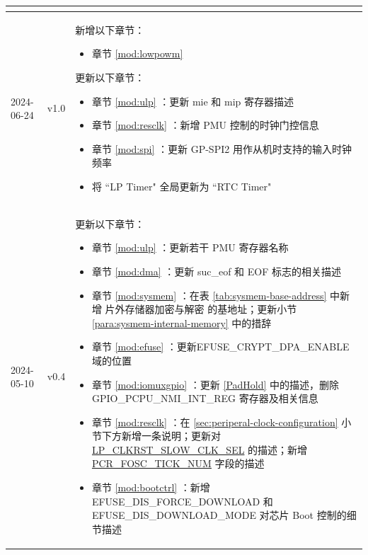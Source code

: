 \begin{longtable}[l]{ | m{2cm} | m{1.5cm} | m{12cm} | }
\begin{itemize}
    \end{itemize}
    \\\hline
    2024-06-24        & v1.0 &
    新增以下章节：
    \begin{itemize}
        \item 章节 \ref{mod:lowpowm} \nameref{mod:lowpowm}
    \end{itemize}
    更新以下章节：
    \begin{itemize}
        \item 章节 \ref{mod:ulp} \textit{\nameref{mod:ulp}}：更新 mie 和 mip 寄存器描述 %
        \item 章节 \ref{mod:resclk} \textit{\nameref{mod:resclk}}：新增 PMU 控制的时钟门控信息 %
        \item 章节 \ref{mod:spi} \textit{\nameref{mod:spi}}：更新 GP-SPI2 用作从机时支持的输入时钟频率 %
        \item 将 ``LP Timer" 全局更新为 ``RTC Timer" %
    \end{itemize}
    \\\hline
    2024-05-10        & v0.4 &
    更新以下章节：
    \begin{itemize}
        \item 章节 \ref{mod:ulp} \textit{\nameref{mod:ulp}}：更新若干 PMU 寄存器名称 %
        \item 章节 \ref{mod:dma} \textit{\nameref{mod:dma}}：更新 suc\_eof 和 EOF 标志的相关描述 %
        \item 章节 \ref{mod:sysmem} \textit{\nameref{mod:sysmem}}：在表 \ref{tab:sysmem-base-address} 中新增 片外存储器加密与解密 的基地址；更新小节 \ref{para:sysmem-internal-memory} 中的措辞 %
        \item 章节 \ref{mod:efuse} \textit{\nameref{mod:efuse}}：更新EFUSE\_CRYPT\_DPA\_ENABLE 域的位置 %
        \item 章节 \ref{mod:iomuxgpio} \textit{\nameref{mod:iomuxgpio}}：更新 \ref{PadHold} 中的描述，删除 GPIO\_PCPU\_NMI\_INT\_REG 寄存器及相关信息 %
        \item 章节 \ref{mod:resclk} \textit{\nameref{mod:resclk}}：在 \ref{sec:periperal-clock-configuration} 小节下方新增一条说明；更新对 \hyperlink{fielddesc:LPCLKRSTSLOWCLKSEL}{LP\_CLKRST\_SLOW\_CLK\_SEL} 的描述；新增 \hyperref[fielddesc:PCRFOSCTICKNUM]{PCR\_FOSC\_TICK\_NUM} 字段的描述 %
        \item 章节 \ref{mod:bootctrl} \textit{\nameref{mod:bootctrl}}：新增 EFUSE\_DIS\_FORCE\_DOWNLOAD 和 EFUSE\_DIS\_DOWNLOAD\_MODE 对芯片 Boot 控制的细节描述 %

\end{itemize}
\end{longtable}
